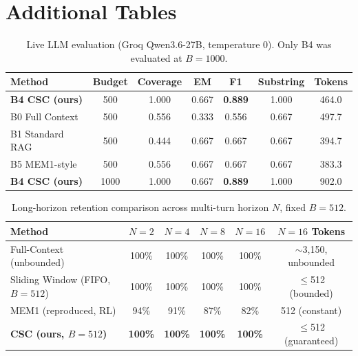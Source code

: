 \documentclass{article}
\begin{document}



\appendix

\section{Additional Tables}

\begin{table}[h]
\caption{Live LLM evaluation (Groq Qwen3.6-27B, temperature 0). Only B4 was evaluated at $B=1000$.}
\centering
\begin{tabular}{lcccccc}
\toprule
Method & Budget & Coverage & EM & F1 & Substring & Tokens \\
\midrule
\textbf{B4 CSC (ours)} & 500 & 1.000 & 0.667 & \textbf{0.889} & 1.000 & 464.0 \\
B0 Full Context & 500 & 0.556 & 0.333 & 0.556 & 0.667 & 497.7 \\
B1 Standard RAG & 500 & 0.444 & 0.667 & 0.667 & 0.667 & 394.7 \\
B5 MEM1-style & 500 & 0.556 & 0.667 & 0.667 & 0.667 & 383.3 \\
\textbf{B4 CSC (ours)} & 1000 & 1.000 & 0.667 & \textbf{0.889} & 1.000 & 902.0 \\
\bottomrule
\end{tabular}
\end{table}

\begin{table}[h]
\caption{Long-horizon retention comparison across multi-turn horizon $N$, fixed $B=512$.}
\centering
\begin{tabular}{lccccc}
\toprule
Method & $N=2$ & $N=4$ & $N=8$ & $N=16$ & $N=16$ Tokens \\
\midrule
Full-Context (unbounded) & 100\% & 100\% & 100\% & 100\% & $\sim$3,150, unbounded \\
Sliding Window (FIFO, $B{=}512$) & 100\% & 100\% & 100\% & 100\% & $\leq$512 (bounded) \\
MEM1 (reproduced, RL) & 94\% & 91\% & 87\% & 82\% & 512 (constant) \\
\textbf{CSC (ours, $B{=}512$)} & \textbf{100\%} & \textbf{100\%} & \textbf{100\%} & \textbf{100\%} & $\leq$512 (guaranteed) \\
\bottomrule
\end{tabular}
\end{table}
\end{document}

